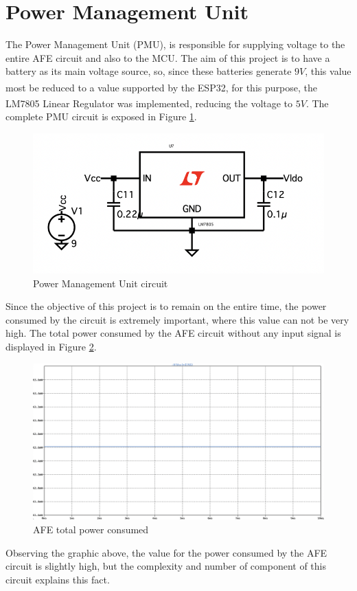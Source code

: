 \section{Power Management Unit}

The Power Management Unit (PMU), is responsible for supplying voltage to the entire AFE circuit and also to the MCU. The aim of this project is to have a battery as its main voltage source, so, since these batteries generate $9V$, this value most be reduced to a value supported by the ESP32\textsuperscript{\cite{ESP32-datasheet}}, for this purpose, the LM7805 Linear Regulator was implemented, reducing the voltage to $5V$\textsuperscript{\cite{lm7805-datasheet}}. The complete PMU circuit is exposed in Figure \ref{fig:PMU}.

\begin{figure}[H]
    \centering
    \includegraphics*[scale = 0.4]{Images/PMU.png}
    \caption{Power Management Unit circuit}
    \label{fig:PMU}
\end{figure}

Since the objective of this project is to remain on the entire time, the power consumed by the circuit is extremely important, where this value can not be very high. The total power consumed by the AFE circuit without any input signal is displayed in Figure \ref{fig:Power}.

\begin{figure}[H]
    \centering
    \includegraphics*[scale = 0.25]{Images/Power.png}
    \caption{AFE total power consumed}
    \label{fig:Power}
\end{figure}

Observing the graphic above, the value for the power consumed by the AFE circuit is slightly high, but the complexity and number of component of this circuit explains this fact. 